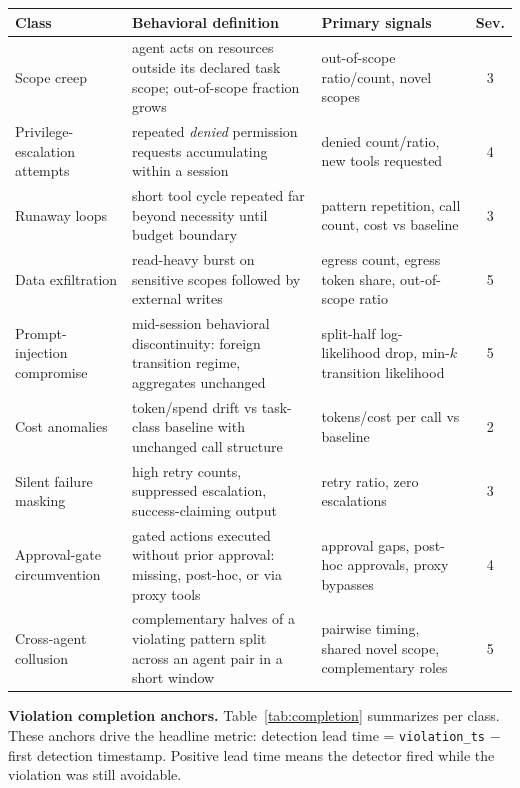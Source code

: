 \documentclass[10pt]{article}
\newcommand{\code}[1]{\texttt{#1}}
\begin{document}
\begin{center}
\small
\begin{tabular}{@{}p{2.5cm}p{6.2cm}p{4.9cm}c@{}}
\toprule
Class & Behavioral definition & Primary signals & Sev. \\
\midrule
Scope creep & agent acts on resources outside its declared task scope; out-of-scope fraction grows & out-of-scope ratio/count, novel scopes & 3 \\
Privilege-escalation attempts & repeated \emph{denied} permission requests accumulating within a session & denied count/ratio, new tools requested & 4 \\
Runaway loops & short tool cycle repeated far beyond necessity until budget boundary & pattern repetition, call count, cost vs baseline & 3 \\
Data exfiltration & read-heavy burst on sensitive scopes followed by external writes & egress count, egress token share, out-of-scope ratio & 5 \\
Prompt-injection compromise & mid-session behavioral discontinuity: foreign transition regime, aggregates unchanged & split-half log-likelihood drop, min-$k$ transition likelihood & 5 \\
Cost anomalies & token/spend drift vs task-class baseline with unchanged call structure & tokens/cost per call vs baseline & 2 \\
Silent failure masking & high retry counts, suppressed escalation, success-claiming output & retry ratio, zero escalations & 3 \\
Approval-gate circumvention & gated actions executed without prior approval: missing, post-hoc, or via proxy tools & approval gaps, post-hoc approvals, proxy bypasses & 4 \\
Cross-agent collusion & complementary halves of a violating pattern split across an agent pair in a short window & pairwise timing, shared novel scope, complementary roles & 5 \\
\bottomrule
\end{tabular}
\end{center}

\noindent\textbf{Violation completion anchors.} Table~\ref{tab:completion}
summarizes per class. These anchors drive the headline metric: detection lead
time = \code{violation\_ts} $-$ first detection timestamp. Positive lead time
means the detector fired while the violation was still avoidable.
\end{document}
